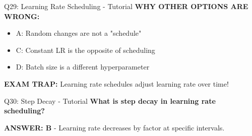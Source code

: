 \documentclass[8pt]{beamer}
\begin{document}
\begin{frame}{Q29: Learning Rate Scheduling - Tutorial}
		\vspace{0.05cm}
		\textcolor{myred}{\textbf{WHY OTHER OPTIONS ARE WRONG:}}
		\begin{itemize}
			\item \textcolor{myred}{A:} Random changes are not a "schedule"
			\item \textcolor{myred}{C:} Constant LR is the opposite of scheduling
			\item \textcolor{myred}{D:} Batch size is a different hyperparameter
		\end{itemize}
		
		\textcolor{myred}{\textbf{EXAM TRAP:}} Learning rate schedules \textcolor{myblue}{adjust learning rate over time}!
	\end{frame}
	
	\begin{frame}{Q30: Step Decay - Tutorial}
		\fontsize{6.5}{7.5}\selectfont
		\textbf{What is step decay in learning rate scheduling?}
		
		\vspace{0.05cm}
		\textcolor{myblue}{\textbf{ANSWER: B}} - Learning rate decreases by factor at specific intervals.
		

\end{frame}
\end{document}
